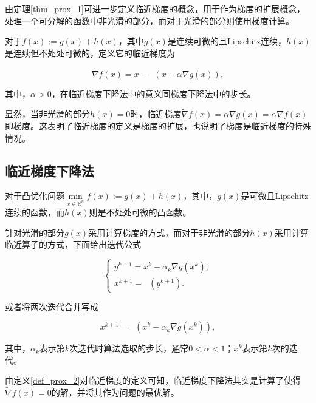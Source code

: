 由定理\ref{thm_prox_1}可进一步定义临近梯度的概念，用于作为梯度的扩展概念，处理一个可分解的函数中非光滑的部分，而对于光滑的部分则使用梯度计算。

\begin{definition}\label{def_prox_2}
    对于$f(x) := g(x)+h(x)$，其中$g(x)$是连续可微的且Lipschitz连续，$h(x)$是连续但不处处可微的，定义它的临近梯度为

    \begin{equation}
        \tilde{\nabla} f(x) = x - \mathop{\mathrm{prox_{\alpha h}}}(x-\alpha \nabla g(x)),
    \end{equation}

    其中，$\alpha > 0$，在临近梯度下降法中的意义同梯度下降法中的步长。
\end{definition}

显然，当非光滑的部分$h(x)=0$时，临近梯度$\tilde{\nabla} f(x)=\alpha \nabla g(x)=\alpha \nabla f(x)$即梯度。这表明了临近梯度的定义是梯度的扩展，也说明了梯度是临近梯度的特殊情况。

\subsection{临近梯度下降法}

对于凸优化问题$\min\limits_{x\in \mathbb{R}^{n}} f(x) := g(x) + h(x)$，其中，$g(x)$是可微且Lipschitz连续的函数，而$h(x)$则是不处处可微的凸函数。

针对光滑的部分$g(x)$采用计算梯度的方式，而对于非光滑的部分$h(x)$采用计算临近算子的方式，下面给出迭代公式

\begin{equation}
    \begin{cases}
        y^{k+1} = x^{k} - \alpha_{k}\nabla g(x^{k}) ;\\
        x^{k+1} = \mathop{\mathrm{prox_{\alpha_{k} h}}}(y^{k+1}).
    \end{cases}
\end{equation}

或者将两次迭代合并写成

\begin{equation}\label{eq_prox_2}
    x^{k+1} = \mathop{\mathrm{prox_{\alpha_{k} h}}}(x^{k} - \alpha_{k}\nabla g(x^{k})),
\end{equation}

其中，$\alpha_{k}$表示第$k$次迭代时算法选取的步长，通常$0<\alpha<1$；$x^{k}$表示第$k$次的迭代。

由定义\ref{def_prox_2}对临近梯度的定义可知，临近梯度下降法其实是计算了使得$\tilde{\nabla} f(x)=0$的解，并将其作为问题的最优解。

